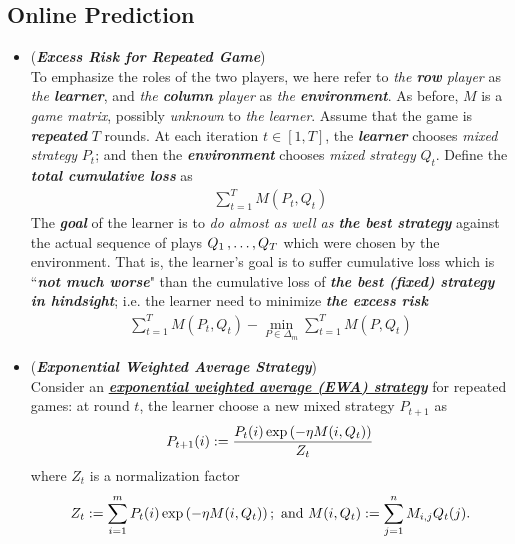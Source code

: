 \documentclass[11pt]{article}
\begin{document}
\subsection{Online Prediction}
\begin{itemize}
\item \begin{remark}(\textbf{\emph{Excess Risk for Repeated Game}})\\
To emphasize the roles of the two players, we here refer to \emph{the \textbf{row} player} as \emph{the \textbf{learner}}, and \emph{the \textbf{column} player} as \emph{the \textbf{environment}}. As before, $M$ is a \emph{game matrix}, possibly \emph{unknown} to \emph{the learner}. Assume that the game is \emph{\textbf{repeated}} $T$ rounds. At each iteration $t \in [1, T]$, the \emph{\textbf{learner}} chooses \emph{mixed strategy} $P_t$; and then the \emph{\textbf{environment}} chooses \emph{mixed strategy} $Q_t$. Define the \emph{\textbf{total cumulative loss}} as
\begin{align*}
 \sum_{t=1}^{T}M(P_t, Q_t) 
\end{align*} 
The \emph{\textbf{goal}} of the learner is to \emph{do almost as well as \textbf{the best strategy}} against the actual sequence of plays $Q_1 \,{,}\ldots{,}\, Q_T$ which were chosen by the environment. That is, the learner's goal is to suffer cumulative loss which is ``\emph{\textbf{not much worse}}" than the cumulative loss of \emph{\textbf{the best (fixed) strategy in hindsight}}; i.e. the learner need to minimize \emph{\textbf{the excess risk}}
\begin{align}
\sum_{t=1}^{T}M(P_t, Q_t)  - \min_{P \in \Delta_m}\sum_{t=1}^{T}M(P, Q_t) \label{def: excess_risk_two_player_seq_game}
\end{align} 
\end{remark}


\item \begin{remark}(\textbf{\emph{Exponential Weighted Average Strategy}}) \citep{cesa2006prediction, schapire2012boosting} \\
Consider an \underline{\emph{\textbf{exponential weighted average (EWA) strategy}}} for repeated games: at round $t$, the learner choose a new mixed strategy $P_{t+1}$ as
\begin{align*}
P_{t+1}(i) := \frac{P_{t}(i) \exp\left(- \eta M(i, Q_t)\right)}{Z_t}
\end{align*} where $Z_t$ is a normalization factor
\begin{align*}
Z_t := \sum_{i=1}^{m}P_{t}(i) \exp\left(- \eta M(i, Q_t)\right); \text{ and } M(i, Q_t) := \sum_{j=1}^{n}M_{i,j}Q_t(j).
\end{align*}
\end{remark}


\end{itemize}
\end{document}
